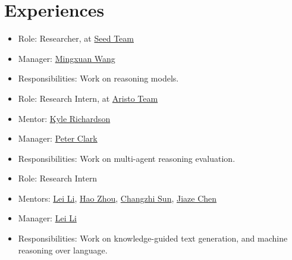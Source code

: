 \documentclass{resume}
\begin{document}
\section{Experiences}

\begin{itemize}
  \item Role: Researcher, at \href{https://team.doubao.com/en/topseed}{Seed Team}
  \item Manager: \href{https://mingxuan.github.io}{Mingxuan Wang}
  \item Responsibilities: Work on reasoning models.
\end{itemize}

\begin{itemize}
  \item Role: Research Intern, at \href{https://allenai.org/aristo}{Aristo Team}
  \item Mentor: \href{https://nlp-kyle.com}{Kyle Richardson}
  \item Manager: \href{https://allenai.org/team/peterc}{Peter Clark}
  \item Responsibilities: Work on multi-agent reasoning evaluation.
\end{itemize}



\begin{itemize}
  \item Role: Research Intern
  \item Mentors: \href{https://lileicc.github.io}{Lei Li}, \href{https://zhouh.github.io}{Hao Zhou}, \href{https://czsun.site}{Changzhi Sun}, \href{https://scholar.google.com/citations?user=Vt1j3kEAAAAJ&hl=en}{Jiaze Chen}
  \item Manager: \href{https://lileicc.github.io}{Lei Li}
  \item Responsibilities: Work on knowledge-guided text generation, and machine reasoning over language.
\end{itemize}
\end{document}
